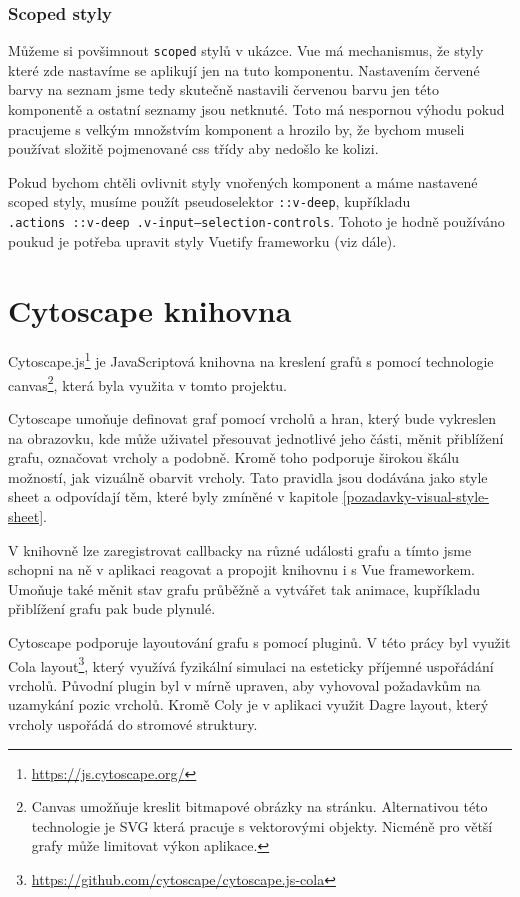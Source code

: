 \subsubsection*{Scoped styly}

Můžeme si povšimnout \texttt{scoped} stylů v ukázce. Vue má mechanismus, že styly které zde nastavíme se aplikují jen na tuto komponentu. Nastavením červené barvy na seznam jsme tedy skutečně nastavili červenou barvu jen této komponentě a ostatní seznamy jsou netknuté. Toto má nespornou výhodu pokud pracujeme s velkým množstvím komponent a hrozilo by, že bychom museli používat složitě pojmenované css třídy aby nedošlo ke kolizi.

Pokud bychom chtěli ovlivnit styly vnořených komponent a máme nastavené scoped styly, musíme použít pseudoselektor \texttt{::v-deep}, kupříkladu \\  \texttt{.actions ::v-deep .v-input--selection-controls}. Tohoto je hodně používáno poukud je potřeba upravit styly Vuetify frameworku (viz dále).

\newpage

\section{Cytoscape knihovna}

Cytoscape.js\footnote{\url{https://js.cytoscape.org/}} je JavaScriptová knihovna na kreslení grafů s pomocí technologie canvas\footnote{Canvas umožňuje kreslit bitmapové obrázky na stránku. Alternativou této technologie je SVG která pracuje s vektorovými objekty. Nicméně pro větší grafy může limitovat výkon aplikace.}, která byla využita v tomto projektu.

Cytoscape umoňuje definovat graf pomocí vrcholů a hran, který bude vykreslen na obrazovku, kde může uživatel přesouvat jednotlivé jeho části, měnit přiblížení grafu, označovat vrcholy a podobně. Kromě toho podporuje širokou škálu možností, jak vizuálně obarvit vrcholy. Tato pravidla jsou dodávána jako style sheet a odpovídají těm, které byly zmíněné v kapitole \ref{pozadavky-visual-style-sheet}.

V knihovně lze zaregistrovat callbacky na různé události grafu a tímto jsme schopni na ně v aplikaci reagovat a propojit knihovnu i s Vue frameworkem. Umoňuje také měnit stav grafu průběžně a vytvářet tak animace, kupříkladu přiblížení grafu pak bude plynulé.

Cytoscape podporuje layoutování grafu s pomocí pluginů. V této prácy byl využit Cola layout\footnote{\url{https://github.com/cytoscape/cytoscape.js-cola}}, který využívá fyzikální simulaci na esteticky příjemné uspořádání vrcholů. Původní plugin byl v mírně upraven, aby vyhovoval požadavkům na uzamykání pozic vrcholů. Kromě Coly je v aplikaci využit Dagre layout, který vrcholy uspořádá do stromové struktury.

